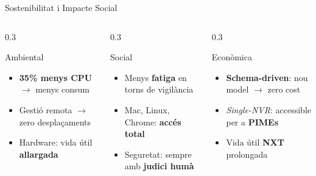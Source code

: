 \begin{frame}{Sostenibilitat i Impacte Social}
  \begin{columns}[T]
    \begin{column}{0.3\textwidth}
      \begin{block}{Ambiental}
        \begin{itemize}
          \item[\small$\bullet$] \textbf{35\% menys CPU} $\to$ menys consum
          \item[\small$\bullet$] Gestió remota $\to$ zero desplaçaments
          \item[\small$\bullet$] Hardware: vida útil \textbf{allargada}
        \end{itemize}
      \end{block}
    \end{column}

    \begin{column}{0.3\textwidth}
      \begin{block}{Social}
        \begin{itemize}
          \item[\small$\bullet$] Menys \textbf{fatiga} en torns de vigilància
          \item[\small$\bullet$] Mac, Linux, Chrome: \textbf{accés total}
          \item[\small$\bullet$] Seguretat: sempre amb \textbf{judici humà}
        \end{itemize}
      \end{block}
    \end{column}

    \begin{column}{0.3\textwidth}
      \begin{block}{Econòmica}
        \begin{itemize}
          \item[\small$\bullet$] \textbf{Schema-driven}: nou model $\to$ zero cost
          \item[\small$\bullet$] \textit{Single-NVR}: accessible per a \textbf{PIMEs}
          \item[\small$\bullet$] Vida útil \textbf{NXT} prolongada
        \end{itemize}
      \end{block}
    \end{column}
  \end{columns}

\end{frame}
